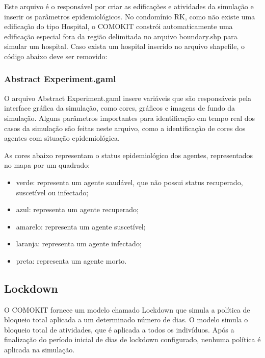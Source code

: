 Este arquivo é o responsável por criar as edificações e atividades da simulação e inserir os parâmetros epidemiológicos. No condomínio RK, como não existe uma edificação do tipo Hospital, o COMOKIT constrói automaticamente uma edificação especial fora da região delimitada no arquivo boundary.shp para simular um hospital. Caso exista um hospital inserido no arquivo shapefile, o código abaixo deve ser removido:


\subsubsection{Abstract Experiment.gaml}

O arquivo Abstract Experiment.gaml insere variáveis que são responsáveis pela interface gráfica da simulação, como cores, gráficos e imagens de fundo da simulação. Alguns parâmetros importantes para identificação em tempo real dos casos da simulação são feitas neste arquivo, como a identificação de cores dos agentes com situação epidemiológica. 

As cores abaixo representam o status epidemiológico dos agentes, representados no mapa por um quadrado:

\begin{itemize}
\item verde: representa um agente saudável, que não possui status recuperado, suscetível ou infectado;
\item azul: representa um agente recuperado;
\item amarelo: representa um agente suscetível;
\item laranja: representa um agente infectado;
\item preta: representa um agente morto.
\end{itemize}


\subsection{Lockdown}

O COMOKIT fornece um modelo chamado Lockdown que simula a política de bloqueio total aplicada a um determinado número de dias. O modelo simula o bloqueio total de atividades, que é aplicada a todos os indivíduos. Após a finalização do período inicial de dias de lockdown configurado, nenhuma política é aplicada na simulação. 

